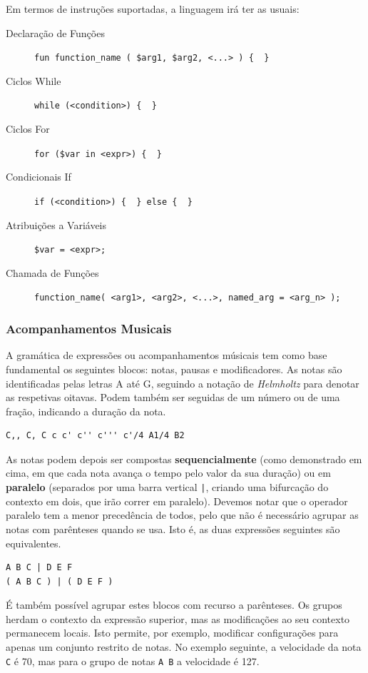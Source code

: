 Em termos de instruções suportadas, a linguagem irá ter as usuais:
\begin{description}
    \item[Declaração de Funções] \verb|fun function_name ( $arg1, $arg2, <...> ) {  }|
    \item[Ciclos While] \verb|while (<condition>) {  }|
    \item[Ciclos For] \verb|for ($var in <expr>) {  }|
    \item[Condicionais If] \verb|if (<condition>) {  } else {  }|
    \item[Atribuições a Variáveis] \verb|$var = <expr>;|
    \item[Chamada de Funções] \verb|function_name( <arg1>, <arg2>, <...>, named_arg = <arg_n> );|
\end{description}

\subsubsection{Acompanhamentos Musicais}
A gramática de expressões ou acompanhamentos músicais tem como base fundamental os seguintes blocos: notas, pausas e modificadores. As notas são identificadas pelas letras A até G, seguindo a notação de \textit{Helmholtz}\cite{helmholtz-pitch-notation} para denotar as respetivas oitavas. Podem também ser seguidas de um número ou de uma fração, indicando a duração da nota.

\begin{lstlisting}[caption={Exemplos de notas}]
C,, C, C c c' c'' c''' c'/4 A1/4 B2
\end{lstlisting}


As notas podem depois ser compostas \textbf{sequencialmente} (como demonstrado em cima, em que cada nota avança o tempo pelo valor da sua duração) ou em \textbf{paralelo} (separados por uma barra vertical \texttt{|}, criando uma bifurcação do contexto em dois, que irão correr em paralelo). Devemos notar que o operador paralelo tem a menor precedência de todos, pelo que não é necessário agrupar as notas com parênteses quando se usa. Isto é, as duas expressões seguintes são equivalentes.

\begin{lstlisting}
A B C | D E F
( A B C ) | ( D E F )
\end{lstlisting}

É também possível agrupar estes blocos com recurso a parênteses. Os grupos herdam o contexto da expressão superior, mas as modificações ao seu contexto permanecem locais. Isto permite, por exemplo, modificar configurações para apenas um conjunto restrito de notas. No exemplo seguinte, a velocidade da nota \texttt{C} é 70, mas para o grupo de notas \texttt{A B} a velocidade é 127.

